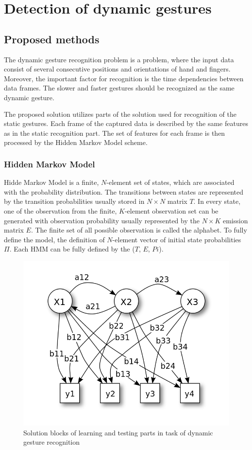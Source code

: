 \chapter{Detection of dynamic gestures}

\section{Proposed methods}

The dynamic gesture recognition problem is a problem, where the input data consist of several consecutive positions and orientations of hand and fingers. 
Moreover, the important factor for recognition is the time dependencies between data frames. 
The slower and faster gestures should be recognized as the same dynamic gesture.

The proposed solution utilizes parts of the solution used for recognition of the static gestures.
Each frame of the captured data is described by the same features as in the static recognition part.
The set of features for each frame is then processed by the Hidden Markov Model scheme. 

\subsection{Hidden Markov Model}

Hidde Markov Model is a finite, $N$-element set of states, which are associated with the probability distribution.
The transitions between states are represented by the transition probabilities usually stored in $N\times N$ matrix $T$.
In every state, one of the observation from the finite, $K$-element observation set can be generated with observation probability usually represented by the $N\times K$ emission matrix $E$.
The finite set of all possible observation is called the alphabet.
To fully define the model, the definition of $N$-element vector of initial state probabilities $\Pi$.
Each HMM can be fully defined by the ($T$, $E$, $Pi$).

\begin{figure}[htb]
\centering
 \includegraphics[width=0.8\columnwidth]{figures/HMM_wiki.png}
 \caption[]{Solution blocks of learning and testing parts in task of dynamic gesture recognition\footnotemark}
 \label{dynamicgestureswiki}
\end{figure}

